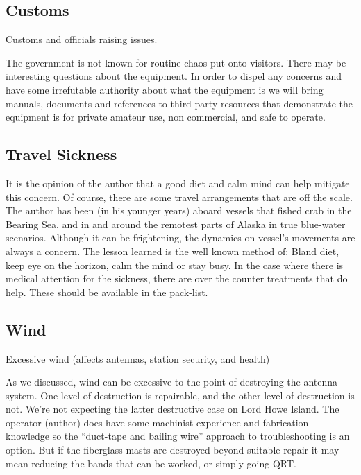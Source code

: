 \documentclass[11pt]{article}
\begin{document}
\subsection{Customs}

Customs and officials raising issues.
\par

 The government
is not known for routine chaos put onto visitors.   There may be
interesting questions about the equipment.  In order to dispel
any concerns and have some irrefutable authority about what the
equipment is we will bring manuals, documents and references to
third party resources that demonstrate the equipment is for 
private amateur use, non commercial, and safe to operate.


\subsection{Travel Sickness}

  It is the opinion of the author that a good
diet and calm mind can help mitigate this concern.  Of course, there
are some travel arrangements that are off the scale.  The author has
been (in his younger years) aboard vessels that fished crab
in the Bearing Sea, and in and around the remotest parts of Alaska
in true blue-water scenarios.  Although it can be frightening,
the dynamics on vessel's movements are always a concern.  The lesson
learned is the well known method of:  Bland diet, keep eye on the
horizon, calm the mind or stay busy.  In the case where there is
medical attention for the sickness, there are over the counter 
treatments that do help.  These should be available in the pack-list.


\subsection{Wind}

Excessive wind (affects antennas, station security, and health)
\par

As we discussed, wind can be excessive to the point of destroying the antenna
system.  One level of destruction is repairable, and the other level of
destruction is not.  We're not expecting the latter destructive case on
Lord Howe Island.  The operator (author) does have some machinist experience
and fabrication knowledge so the ``duct-tape and bailing wire'' approach
to troubleshooting is an option.  But if the fiberglass masts are destroyed
beyond suitable repair it may mean reducing the bands that can be worked,
or simply going QRT.
\end{document}
